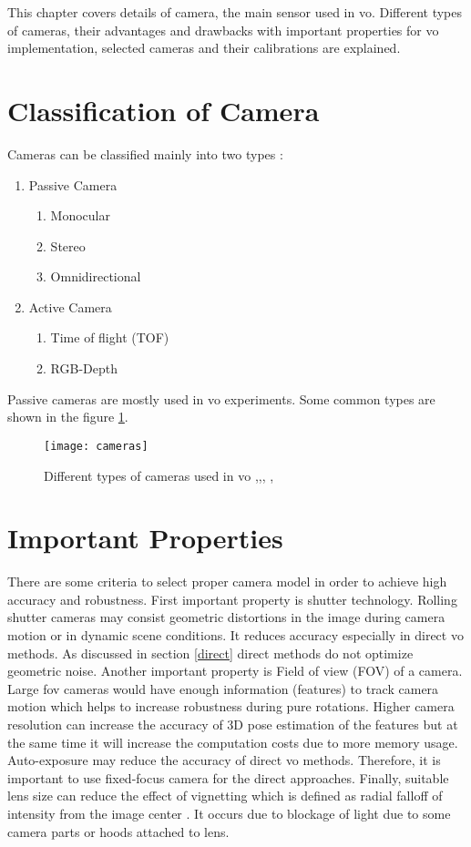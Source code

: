 This chapter covers details of camera, the main sensor used in \acrshort{vo}. Different types of cameras, their advantages and drawbacks with important properties for \acrshort{vo} implementation, selected cameras and their calibrations are explained. 

\section{Classification of Camera}
Cameras can be classified mainly into two types :
\begin{enumerate}
	\item Passive Camera
	\begin{enumerate}
		\item Monocular
		\item Stereo
		\item Omnidirectional
	\end{enumerate}
	\item Active Camera
	\begin{enumerate}
		\item Time of flight (TOF)
		\item RGB-Depth
	\end{enumerate}
\end{enumerate}
Passive cameras are mostly used in \acrshort{vo} experiments. Some common types are shown in the figure \ref{fig:cameras}.
\begin{figure}[h]
	\centering
	\texttt{[image: cameras]}
	\caption{Different types of cameras used in \acrshort{vo} \cite{ids},\cite{kinect},\cite{zed}, \cite{omni},\cite{tof}}
	\label{fig:cameras}
\end{figure}

\section{Important Properties}
There are some criteria to select proper camera model in order to achieve high accuracy and robustness. First important property is shutter technology. Rolling shutter cameras may consist geometric distortions in the image during camera motion or in dynamic scene conditions. It reduces accuracy especially in direct \acrshort{vo} methods. As discussed in section \ref{direct} direct methods do not optimize geometric noise. Another important property is Field of view (FOV) of a camera. Large \acrshort{fov} cameras would have enough information (features) to track camera motion which helps to increase robustness during pure rotations. Higher camera resolution can increase the accuracy of 3D pose estimation of the features but at the same time it will increase the computation costs due to more memory usage. Auto-exposure may reduce the accuracy of direct \acrshort{vo} methods. Therefore, it is important to use fixed-focus camera for the direct approaches. Finally, suitable lens size can reduce the effect of vignetting which is defined as radial falloff of intensity from the image center \cite{vignette}. It occurs due to blockage of light due to some camera parts or hoods attached to lens.

